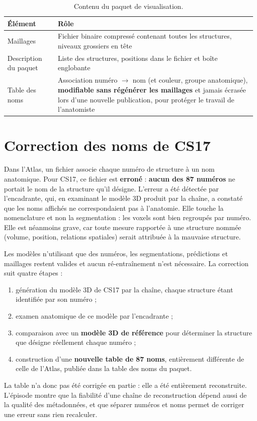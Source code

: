 \documentclass[12pt,a4paper]{report}
\begin{document}
\begin{table}[H]
\centering
\small
\begin{tabular}{p{4.3cm}p{10cm}}
\toprule
\textbf{Élément} & \textbf{Rôle} \\
\midrule
Maillages & Fichier binaire compressé contenant toutes les structures, niveaux grossiers en tête \\
Description du paquet & Liste des structures, positions dans le fichier et boîte englobante \\
Table des noms & Association numéro $\rightarrow$ nom (et couleur, groupe anatomique), \textbf{modifiable sans régénérer les maillages} et jamais écrasée lors d'une nouvelle publication, pour protéger le travail de l'anatomiste \\
\bottomrule
\end{tabular}
\caption{Contenu du paquet de visualisation.}
\label{tab:pack}
\end{table}

\section{Correction des noms de CS17}

Dans l'Atlas, un fichier associe chaque numéro de structure à un nom anatomique. Pour CS17, ce fichier est \textbf{erroné} : \textbf{aucun des 87 numéros} ne portait le nom de la structure qu'il désigne. L'erreur a été détectée par l'encadrante, qui, en examinant le modèle 3D produit par la chaîne, a constaté que les noms affichés ne correspondaient pas à l'anatomie. Elle touche la nomenclature et non la segmentation : les voxels sont bien regroupés par numéro. Elle est néanmoins grave, car toute mesure rapportée à une structure nommée (volume, position, relations spatiales) serait attribuée à la mauvaise structure.

Les modèles n'utilisant que des numéros, les segmentations, prédictions et maillages restent valides et aucun ré-entraînement n'est nécessaire. La correction suit quatre étapes :
\begin{enumerate}
    \item génération du modèle 3D de CS17 par la chaîne, chaque structure étant identifiée par son numéro ;
    \item examen anatomique de ce modèle par l'encadrante ;
    \item comparaison avec un \textbf{modèle 3D de référence} pour déterminer la structure que désigne réellement chaque numéro ;
    \item construction d'une \textbf{nouvelle table de 87 noms}, entièrement différente de celle de l'Atlas, publiée dans la table des noms du paquet.
\end{enumerate}
La table n'a donc pas été corrigée en partie : elle a été entièrement reconstruite. L'épisode montre que la fiabilité d'une chaîne de reconstruction dépend aussi de la qualité des métadonnées, et que séparer numéros et noms permet de corriger une erreur sans rien recalculer.
\end{document}
